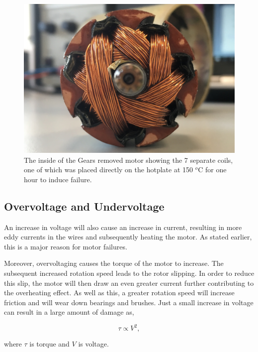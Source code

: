 \begin{figure}[t]
    \includegraphics[width=1.0\textwidth]{fig/Gears_Removed_Inside.JPG}
    \caption[Motor Placed on Hotplate]{The inside of the Gears removed motor showing the 7 separate coils, one of which was placed directly on the hotplate at 150 $^o$C for one hour to induce failure.}
    \label{fig:hotplate_motor}
\end{figure}



\subsection{Overvoltage and Undervoltage}

An increase in voltage will also cause an increase in current, resulting in more eddy currents in the wires and subsequently heating the motor. As stated earlier, this is a major reason for motor failures. 

Moreover, overvoltaging causes the torque of the motor to increase. The subsequent increased rotation speed leads to the rotor slipping. In order to reduce this slip, the motor will then draw an even greater current further contributing to the overheating effect. As well as this, a greater rotation speed will increase friction and will wear down bearings and brushes. Just a small increase in voltage can result in a large amount of damage as,

\begin{equation}
\tau \propto V^2,
\label{Torque}
\end{equation}

where $\tau$ is torque and $V$ is voltage.

